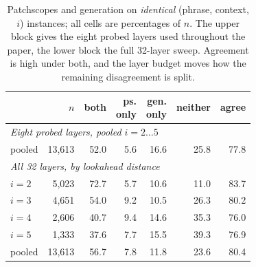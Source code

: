 \begin{table}[t]
\centering\small
\begin{tabular}{lrrrrrr}
\toprule
& $n$ & both & \makecell{ps.\\only} & \makecell{gen.\\only} & neither & agree \\
\midrule
\multicolumn{7}{l}{\textit{Eight probed layers, pooled $i=2\ldots5$}} \\
\quad pooled & 13,613 & 52.0 & 5.6 & 16.6 & 25.8 & 77.8 \\
\midrule
\multicolumn{7}{l}{\textit{All 32 layers, by lookahead distance}} \\
\quad $i=2$ & 5,023 & 72.7 & 5.7 & 10.6 & 11.0 & 83.7 \\
\quad $i=3$ & 4,651 & 54.0 & 9.2 & 10.5 & 26.3 & 80.2 \\
\quad $i=4$ & 2,606 & 40.7 & 9.4 & 14.6 & 35.3 & 76.0 \\
\quad $i=5$ & 1,333 & 37.6 & 7.7 & 15.5 & 39.3 & 76.9 \\
\quad pooled & 13,613 & 56.7 & 7.8 & 11.8 & 23.6 & 80.4 \\
\bottomrule
\end{tabular}
\caption{Patchscopes and generation on \emph{identical} (phrase, context, $i$)
instances; all cells are percentages of $n$. The upper block gives the eight
probed layers used throughout the paper, the lower block the full 32-layer
sweep. Agreement is high under both, and the layer budget moves how the
remaining disagreement is split.}
\label{tab:agreement}
\end{table}
